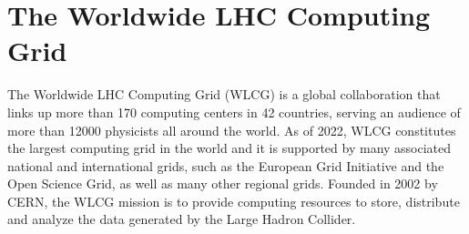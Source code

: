 \section{The Worldwide LHC Computing Grid}
\label{wlcg}

The Worldwide LHC Computing Grid (WLCG) \cite{bird2011computing} is a global collaboration that links up more than 170 computing centers in 42 countries, serving an audience of more than 12000 physicists all around the world. 
As of 2022, WLCG constitutes the largest computing grid in the world and it is supported by many associated national and international grids, such as the European Grid Initiative and the Open Science Grid, as well as many other regional grids.
Founded in 2002 by CERN, the WLCG mission is to provide computing resources to store, distribute and analyze the data generated by the Large Hadron Collider.

